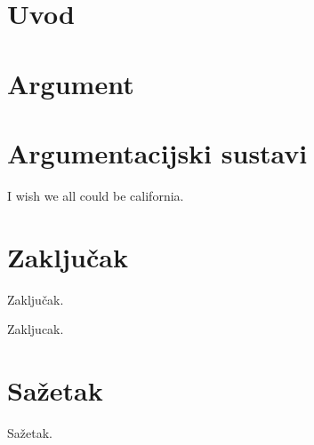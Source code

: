 \documentclass[times, utf8, seminar]{fer}
\begin{document}
% 
\author{Student: Filip Boltužić}
% 
 
\maketitle
 
\tableofcontents
 
\chapter{Uvod} 

 
\chapter{Argument} 

 
\chapter{Argumentacijski sustavi} 


I wish \citep{chesnevar2006towards} we all could be california.

\chapter{Zaključak} Zaključak.

Zakljucak. 

 

\chapter{Sažetak} Sažetak.
\end{document}
